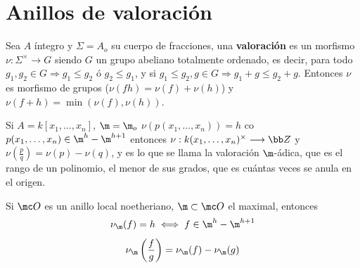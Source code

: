 \section{Anillos de valoraci\'on}
\begin{defi} Sea $A$ \'integro y $\Sigma = A_o$ su cuerpo de fracciones, una \textbf{valoraci\'on} es un morfismo
    $\nu : \Sigma^{\times} \longrightarrow G$ siendo $G$ un grupo abeliano totalmente ordenado, es decir, para todo $g_1,g_2\in G \Rightarrow g_1 \le g_2 \text{ \'o } g_2\le g_1$, y si $g_1\le g_2, g\in G \Rightarrow g_1 + g \le g_2 + g$. Entonces $\nu$ es morfismo de grupos ($\nu(fh) = \nu (f) + \nu(h)$) y $\nu(f+h) = \min(\nu(f), \nu(h))$. 
\end{defi}
\begin{ejem}
    Si $A=k[x_1, \ldots, x_n]$, $\m=\m_o$ $\nu(p(x_1, \ldots, x_n)) = h$ co $p(x_1, \ldots, x_n) \in \m^h - \m^{h+1}$ entonces $\nu: k(x_1, \ldots, x_n)^{\times} \longrightarrow \bb Z$ y $\nu\left(\frac{p}{q}\right) = \nu(p)-\nu(q)$, y es lo que se llama la valoraci\'on $\m$-\'adica, que es el rango de un polinomio, el menor de sus grados, que es cu\'antas veces se anula en el origen. 
\end{ejem}
\begin{ejem}
    Si $\mc O$ es un anillo local noetheriano, $\m \subset \mc O$ el maximal, entonces
    $$\nu_{\m} (f) = h \iff f\in \m^h - \m^{h+1}$$
    $$\nu_{\m}\left(\frac{f}{g} \right) = \nu_\m (f) - \nu_\m(g)$$
\end{ejem}

